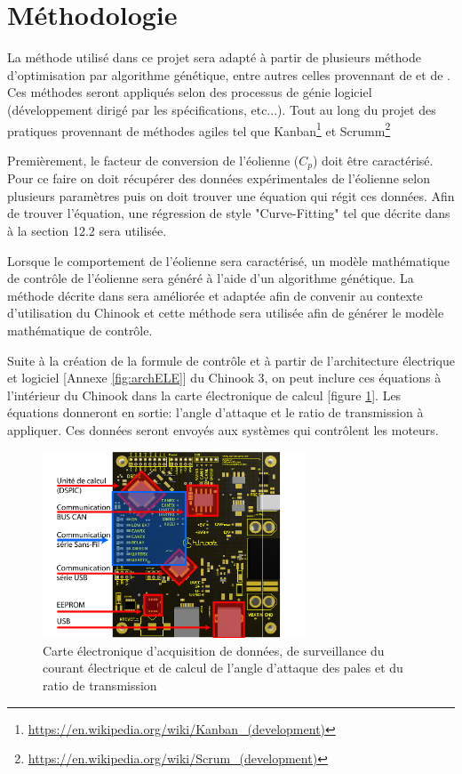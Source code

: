 \documentclass[11pt]{article}
\begin{document}
\section{Méthodologie}

La méthode utilisé dans ce projet sera adapté à partir de plusieurs méthode d'optimisation par algorithme génétique, entre autres celles provennant de \cite{GeneticField} et de \cite{Ouissam12}. Ces méthodes seront appliqués selon des processus de génie logiciel (développement dirigé par les spécifications, etc...). Tout au long du projet des pratiques provennant de méthodes agiles tel que Kanban\footnote{\url{https://en.wikipedia.org/wiki/Kanban_(development)}} et Scrumm\footnote{\url{https://en.wikipedia.org/wiki/Scrum_(development)}} 

Premièrement, le facteur de conversion de l'éolienne ($C_p$) doit être caractérisé. Pour ce faire on doit récupérer des données expérimentales de l'éolienne selon plusieurs paramètres puis on doit trouver une équation qui régit ces données. Afin de trouver l'équation, une régression de style "Curve-Fitting" tel que décrite dans \cite{GeneticField} à la section 12.2 sera utilisée.

Lorsque le comportement de l'éolienne sera caractérisé, un modèle mathématique de contrôle de l'éolienne sera généré à l'aide d'un algorithme génétique. La méthode décrite dans \cite{Ouissam12} sera améliorée et adaptée afin de convenir au contexte d'utilisation du Chinook et cette méthode sera utilisée afin de générer le modèle mathématique de contrôle.

Suite à la création de la formule de contrôle et à partir de l'architecture électrique et logiciel [Annexe \ref{fig:archELE}] du Chinook 3, on peut inclure ces équations à l'intérieur du Chinook dans la carte électronique de calcul [figure \ref{fig:carteElec}]. Les équations donneront en sortie: l'angle d'attaque et le ratio de transmission à appliquer. Ces données seront envoyés aux systèmes qui contrôlent les moteurs.

\begin{figure}[H]
  \centering
  \includegraphics[width=0.7\textwidth]{images/3d-top-annoté.pdf}
  \caption[Carte électronique de calcul]{Carte électronique d'acquisition de données, de surveillance du courant électrique et de calcul de l'angle d'attaque des pales et du ratio de transmission}
  \label{fig:carteElec}
\end{figure}
\end{document}
